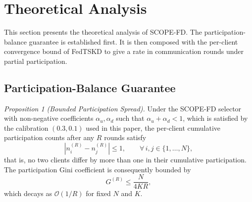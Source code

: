\documentclass[journal]{IEEEtran}
\newcommand{\rev}[1]{{\color{blue}#1}}
\begin{document}
\section{Theoretical Analysis}
\label{sec:theory}

This section presents the theoretical analysis of SCOPE-FD. The participation-balance guarantee is established first. \rev{It is then composed with the per-client convergence bound of FedTSKD \cite{mu2024fedtskd} to give a rate in communication rounds under partial participation.}

\subsection{Participation-Balance Guarantee}
\label{ssec:participation-balance}

\textit{Proposition 1 (Bounded Participation Spread).} Under the SCOPE-FD selector with non-negative coefficients $\alpha_u, \alpha_d$ such that $\alpha_u + \alpha_d < 1$, which is satisfied by the calibration $(0.3, 0.1)$ used in this paper, the per-client cumulative participation counts after any $R$ rounds satisfy
\begin{equation}
\left| n_i^{(R)} - n_j^{(R)} \right| \le 1, \qquad \forall\, i,j \in \{1,\dots,N\},
\label{eq:spread}
\end{equation}
that is, no two clients differ by more than one in their cumulative participation. The participation Gini coefficient is consequently bounded by
\begin{equation}
G^{(R)} \le \frac{N}{4KR},
\label{eq:gini_bound}
\end{equation}
which decays as $\mathcal{O}(1/R)$ for fixed $N$ and $K$.
\end{document}
